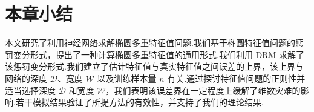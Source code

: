 \section{本章小结}\label{sec dis}
本文研究了利用神经网络求解椭圆多重特征值问题.我们基于椭圆特征值问题的惩罚变分形式，提出了一种计算椭圆多重特征值的通用形式.我们利用 DRM 求解了该惩罚变分形式.我们建立了估计特征值与真实特征值之间误差的上界，该上界与网络的深度 $\mathcal{D}$、宽度 $\mathcal{W}$ 以及训练样本量 $n$ 有关.通过探讨特征值问题的正则性并适当选择深度 $\mathcal{D}$ 和宽度 $\mathcal{W}$，我们表明该误差界在一定程度上缓解了维数灾难的影响.若干模拟结果验证了所提方法的有效性，并支持了我们的理论结果.









